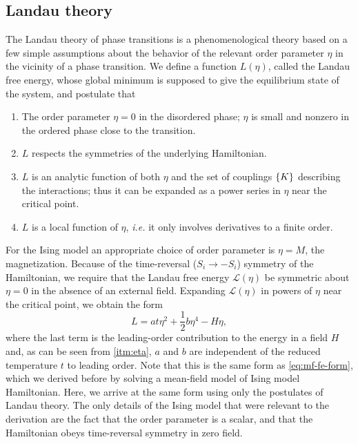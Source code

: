 \subsection{Landau theory}
\label{sec:intro-landau}

The Landau theory of phase transitions is a phenomenological theory based on
a few simple assumptions about the behavior of the relevant order parameter
$\eta$ in the vicinity of a phase transition. We define a function $L(\eta)$,
called the Landau free energy, whose global minimum is supposed to give the
equilibrium state of the system, and postulate that
\begin{enumerate}
  \item The order parameter $\eta=0$ in the disordered phase; $\eta$ is small
    and nonzero in the ordered phase close to the transition.
    \label{itm:eta}
  \item $L$ respects the symmetries of the underlying Hamiltonian.
  \item $L$ is an analytic function of both $\eta$ and the set of couplings
    $\cbr{K}$ describing the interactions; thus it can be expanded as a power
    series in $\eta$ near the critical point.
  \item $L$ is a local function of $\eta$, \textit{i.e.} it only involves
    derivatives to a finite order.
\end{enumerate}

For the Ising model an appropriate choice of order parameter is $\eta=M$, the
magnetization. Because of the time-reversal ($S_i \to -S_i$) symmetry of the
Hamiltonian, we require that the Landau free energy $\mathcal{L}(\eta)$ be
symmetric about $\eta=0$ in the absence of an external field. Expanding
$\mathcal{L}(\eta)$ in powers of $\eta$ near the critical point, we obtain the
form
\begin{equation}
  L = a t \eta^2 + \frac{1}{2} b \eta^4 - H \eta,
  \label{eq:landau-fe}
\end{equation}
where the last term is the leading-order contribution to the energy in a field
$H$ and, as can be seen from \cref{itm:eta}, $a$ and $b$ are independent of the
reduced temperature $t$ to leading order. Note that this is the same form as
\cref{eq:mf-fe-form}, which we derived before by solving a mean-field model of
Ising model Hamiltonian. Here, we arrive at the same form using only the
postulates of Landau theory. The only details of the Ising model that were
relevant to the derivation are the fact that the order parameter is a scalar,
and that the Hamiltonian obeys time-reversal symmetry in zero field.

